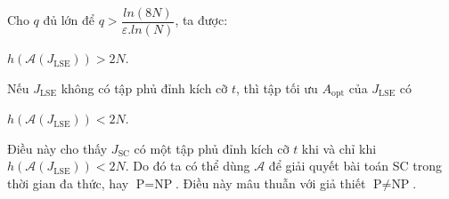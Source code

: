  	Cho $q$ đủ lớn để $q > \dfrac{ln(8N)}{\varepsilon.ln(N)}$, ta được: 
 	\begin{center}
 		$h(\mathcal{A}(J_{\text{LSE}})) > 2N$.
 	\end{center}
 	
 	Nếu $J_{\text{LSE}}$ không có tập phủ đỉnh kích cỡ $t$, thì tập tối ưu $A_{\text{opt}}$ của $J_{\text{LSE}}$ có 
 	\begin{center}
 		$h(\mathcal{A}(J_{\text{LSE}})) < 2N$.
 	\end{center}
 	
 	Điều này cho thấy $J_{\text{SC}}$ có một tập phủ đỉnh kích cỡ $t$ khi và chỉ khi $h(\mathcal{A}(J_{\text{LSE}})) < 2N$. Do đó ta có thể dùng $\mathcal{A}$ để giải quyết bài toán SC trong thời gian đa thức, hay $\text{P} = \text{NP}$. Điều này mâu thuẫn với giả thiết $\text{P} \neq \text{NP}$.
 	
